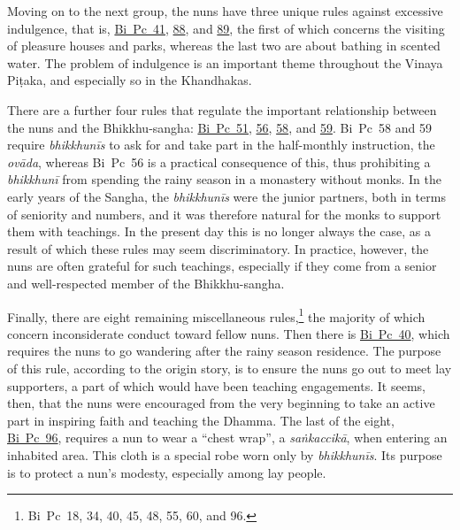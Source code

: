 \documentclass[12pt,openany]{book}%
\begin{document}
Moving on to the next group, the nuns have three unique rules against excessive indulgence, that is, \href{https://suttacentral.net/pli-tv-bi-vb-pc41/en/brahmali\#1.16.1}{Bi~Pc~41}, \href{https://suttacentral.net/pli-tv-bi-vb-pc88/en/brahmali\#1.14.1}{88}, and \href{https://suttacentral.net/pli-tv-bi-vb-pc89/en/brahmali\#1.14.1}{89}, the first of which concerns the visiting of pleasure houses and parks, whereas the last two are about bathing in scented water. The problem of indulgence is an important theme throughout the Vinaya \textsanskrit{Piṭaka}, and especially so in the Khandhakas.

There are a further four rules that regulate the important relationship between the nuns and the Bhikkhu-sangha: \href{https://suttacentral.net/pli-tv-bi-vb-pc51/en/brahmali\#3.9.1}{Bi~Pc~51}, \href{https://suttacentral.net/pli-tv-bi-vb-pc56/en/brahmali\#1.16.1}{56}, \href{https://suttacentral.net/pli-tv-bi-vb-pc58/en/brahmali\#1.14.1}{58}, and \href{https://suttacentral.net/pli-tv-bi-vb-pc59/en/brahmali\#1.11.1}{59}. Bi Pc 58 and 59 require \textit{\textsanskrit{bhikkhunīs}} to ask for and take part in the half-monthly instruction, the \textit{\textsanskrit{ovāda}}, whereas Bi Pc 56 is a practical consequence of this, thus prohibiting a \textit{\textsanskrit{bhikkhunī}} from spending the rainy season in a monastery without monks. In the early years of the Sangha, the \textit{\textsanskrit{bhikkhunīs}} were the junior partners, both in terms of seniority and numbers, and it was therefore natural for the monks to support them with teachings. In the present day this is no longer always the case, as a result of which these rules may seem discriminatory. In practice, however, the nuns are often grateful for such teachings, especially if they come from a senior and well-respected member of the Bhikkhu-sangha.

Finally, there are eight remaining miscellaneous rules,\footnote{Bi Pc 18, 34, 40, 45, 48, 55, 60, and 96. } the majority of which concern inconsiderate conduct toward fellow nuns. Then there is \href{https://suttacentral.net/pli-tv-bi-vb-pc40/en/brahmali\#1.13.1}{Bi~Pc~40}, which requires the nuns to go wandering after the rainy season residence. The purpose of this rule, according to the origin story, is to ensure the nuns go out to meet lay supporters, a part of which would have been teaching engagements. It seems, then, that the nuns were encouraged from the very beginning to take an active part in inspiring faith and teaching the Dhamma. The last of the eight, \href{https://suttacentral.net/pli-tv-bi-vb-pc96/en/brahmali\#1.16.1}{Bi~Pc~96}, requires a nun to wear a “chest wrap”, a \textit{\textsanskrit{saṅkaccikā}}, when entering an inhabited area. This cloth is a special robe worn only by \textit{\textsanskrit{bhikkhunīs}}. Its purpose is to protect a nun’s modesty, especially among lay people.
\end{document}

